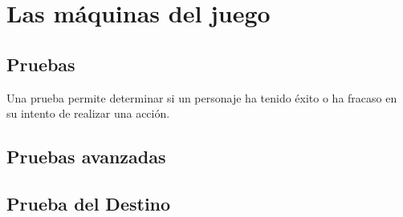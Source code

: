 \chapter{Las máquinas del juego}

\section{Pruebas}

Una prueba permite determinar si un personaje ha tenido éxito o ha fracaso en su intento de realizar una acción.

\section{Pruebas avanzadas}

\section{Prueba del Destino}








